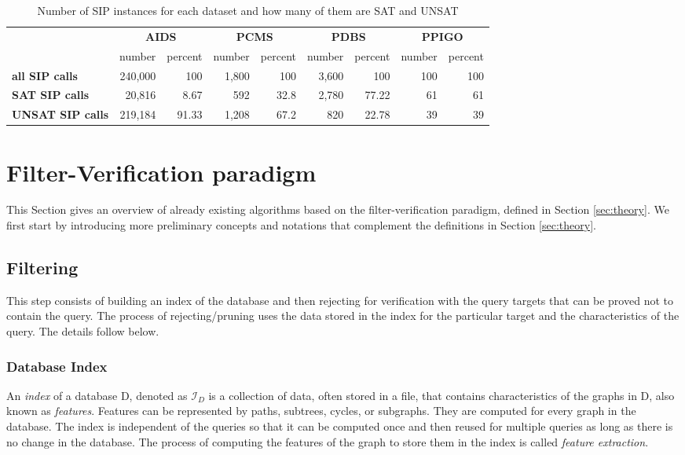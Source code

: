 \documentclass{l4proj}
\newcommand{\fancyI}{\mathcal{I}}
\begin{document}
\begin{table}
\centering
        \renewcommand{\arraystretch}{1.5}%
        \begin{tabular}{l|r|r|r|r|r|r|r|r|}
            \cline{2-9}
            &
             \multicolumn{2}{c}{\textbf{AIDS}} & 
             \multicolumn{2}{|c}{\textbf{PCMS}} & 
             \multicolumn{2}{|c|}{\textbf{PDBS}} & 
             \multicolumn{2}{c|}{\textbf{PPIGO}} \\
            \cline{2-9}
              & number  & percent & number & percent & number & percent & number & percent \\
              \hline
            \multicolumn{1}{|l|}{\textbf{all SIP calls}}  &240,000   &100 &1,800 &100 &3,600 &100 &100 &100 \\
            \multicolumn{1}{|l|}{\textbf{SAT SIP calls}}  &20,816 &8.67 &592 &32.8 &2,780 &77.22 &61 &61 \\
            \multicolumn{1}{|l|}{\textbf{UNSAT SIP calls}} &219,184 &91.33 &1,208 &67.2 &820 &22.78 &39 &39 \\
            \hline
        \end{tabular}
        \caption{Number of SIP instances for each dataset and how many of them are SAT and UNSAT}
        \label{table:dataSAT}
    \end{table}


\section{Filter-Verification paradigm}
\label{sec:filterVerificationParadigm}
This Section gives an overview of already existing algorithms based on the filter-verification paradigm, defined in Section \ref{sec:theory}. We first start by introducing more preliminary concepts and notations that complement the definitions in Section \ref{sec:theory}. 

\subsection{Filtering}
This step consists of building an index of the database and then rejecting for verification with the query targets that can be proved not to contain the query. The process of rejecting/pruning uses the data stored in the index for the particular target and the characteristics of the query. The details follow below.

\subsubsection{Database Index}
An \emph{index} of a database D, denoted as $\fancyI_{D}$ is a collection of data, often stored in a file, that contains characteristics of the graphs in D, also known as \emph{features}. Features can be represented by paths, subtrees, cycles, or subgraphs. They are computed for every graph in the database. The index is independent of the queries so that it can be computed once and then reused for multiple queries as long as there is no change in the database. The process of computing the features of the graph to store them in the index is called \emph{feature extraction}.
\end{document}

